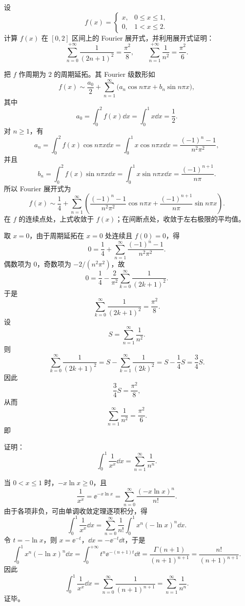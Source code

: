 \begin{question}

设
\[
f(x)=
\begin{cases}
x, & 0\le x\le 1,\\[2pt]
0, & 1<x\le 2.
\end{cases}
\]
计算 $f(x)$ 在 $[0,2]$ 区间上的 Fourier 展开式，并利用展开式证明：
\[
\sum_{n=0}^{+\infty}\frac{1}{(2n+1)^2}=\frac{\pi^2}{8},
\qquad
\sum_{n=1}^{+\infty}\frac{1}{n^2}=\frac{\pi^2}{6}.
\]

\begin{solution}

把 $f$ 作周期为 $2$ 的周期延拓。其 Fourier 级数形如
\[
f(x)\sim \frac{a_0}{2}+\sum_{n=1}^{\infty}\bigl(a_n\cos n\pi x+b_n\sin n\pi x\bigr),
\]
其中
\[
a_0=\int_0^2 f(x)\dd{x}=\int_0^1 x\dd{x}=\frac12.
\]
对 $n\ge1$，有
\[
a_n=\int_0^2 f(x)\cos n\pi x\dd{x}
=\int_0^1 x\cos n\pi x\dd{x}
=\frac{(-1)^n-1}{n^2\pi^2},
\]
并且
\[
b_n=\int_0^2 f(x)\sin n\pi x\dd{x}
=\int_0^1 x\sin n\pi x\dd{x}
=\frac{(-1)^{n+1}}{n\pi}.
\]
所以 Fourier 展开式为
\[
f(x)\sim \frac14+\sum_{n=1}^{\infty}\left(\frac{(-1)^n-1}{n^2\pi^2}\cos n\pi x+\frac{(-1)^{n+1}}{n\pi}\sin n\pi x\right).
\]
在 $f$ 的连续点处，上式收敛于 $f(x)$；在间断点处，收敛于左右极限的平均值。

取 $x=0$，由于周期延拓在 $x=0$ 处连续且 $f(0)=0$，得
\[
0=\frac14+\sum_{n=1}^{\infty}\frac{(-1)^n-1}{n^2\pi^2}.
\]
偶数项为 $0$，奇数项为 $-2/(n^2\pi^2)$，故
\[
0=\frac14-\frac2{\pi^2}\sum_{k=0}^{\infty}\frac{1}{(2k+1)^2}.
\]
于是
\[
\sum_{k=0}^{\infty}\frac{1}{(2k+1)^2}=\frac{\pi^2}{8}.
\]
设
\[
S=\sum_{n=1}^{\infty}\frac1{n^2}.
\]
则
\[
\sum_{k=0}^{\infty}\frac1{(2k+1)^2}=S-\sum_{k=1}^{\infty}\frac1{(2k)^2}=S-\frac14S=\frac34S.
\]
因此
\[
\frac34S=\frac{\pi^2}{8},
\]
从而
\[
\sum_{n=1}^{\infty}\frac1{n^2}=\frac{\pi^2}{6}.
\]
即

\end{solution}
\end{question}

\begin{question}[积分恒等式]

证明：
\[
\int_0^1\frac{1}{x^x}\dd{x}=\sum_{n=1}^{\infty}\frac{1}{n^n}.
\]

\begin{solution}

当 $0<x\le1$ 时，$-x\ln x\ge0$，且
\[
\frac1{x^x}=\ee^{-x\ln x}=\sum_{n=0}^{\infty}\frac{(-x\ln x)^n}{n!}.
\]
由于各项非负，可由单调收敛定理逐项积分，得
\[
\int_0^1\frac1{x^x}\dd{x}
=\sum_{n=0}^{\infty}\frac1{n!}\int_0^1 x^n(-\ln x)^n\dd{x}.
\]
令 $t=-\ln x$，则 $x=\ee^{-t}$，$\dd{x}=-\ee^{-t}\dd{t}$，于是
\[
\int_0^1 x^n(-\ln x)^n\dd{x}
=\int_0^{+\infty}t^n\ee^{-(n+1)t}\dd{t}
=\frac{\Gamma(n+1)}{(n+1)^{n+1}}
=\frac{n!}{(n+1)^{n+1}}.
\]
因此
\[
\int_0^1\frac1{x^x}\dd{x}
=\sum_{n=0}^{\infty}\frac1{(n+1)^{n+1}}
=\sum_{n=1}^{\infty}\frac1{n^n}.
\]
证毕。

\end{solution}
\end{question}
